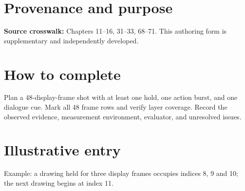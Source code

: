 \documentclass[10pt,letterpaper]{article}
\begin{document}
\makedoctitle
\makedocsummary

\section{Provenance and purpose}
\textbf{Source crosswalk:} Chapters 11--16, 31--33, 68--71. This authoring form is supplementary and independently developed.
\section{How to complete}
Plan a 48-display-frame shot with at least one hold, one action burst, and one dialogue cue. Mark all 48 frame rows and verify layer coverage. Record the observed evidence, measurement environment, evaluator, and unresolved issues. 
\section{Illustrative entry}
Example: a drawing held for three display frames occupies indices 8, 9 and 10; the next drawing begins at index 11.
\end{document}
